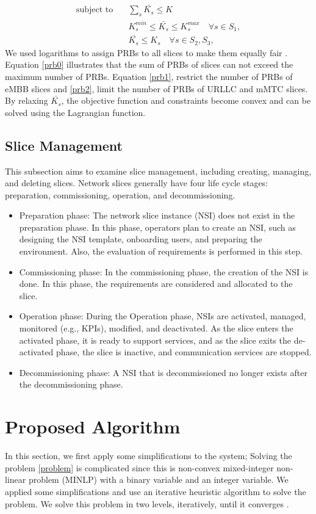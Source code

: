 \documentclass[lettersize,journal]{IEEEtran}
\begin{document}
{\begin{subequations}
\begin{alignat}{4}
\text{subject to} \quad  & \sum_s{\bar{K_s}} \leq K
 \label{prb0} \\
& K_s^{min} \leq \bar{K_s}  \leq K_s^{max}  \quad \forall s \in S_1,\label{prb1} \\
&  \bar{K_s} \leq K_s  \quad \forall s \in S_2, S_3,\label{prb2}
\end{alignat}
\label{constraints}
\end{subequations}
We used logarithms to assign PRBs to all slices to make them equally fair \cite{marabissi2019highly}.
Equation \eqref{prb0} illustrates that the sum of PRBs of slices can not exceed the maximum number of PRBs. 
Equation \eqref{prb1}, restrict the number of PRBs of eMBB slices and \eqref{prb2}, limit the number of PRBs of URLLC and mMTC slices. By relaxing $\bar{K_s}$, the objective function and constraints become convex and can be solved using the Lagrangian function.
}
\subsection{Slice Management}
\textcolor{RedViolet}{This subsection aims to examine slice management, including creating, managing, and deleting slices. Network slices generally have four life cycle stages: preparation, commissioning, operation, and decommissioning. 
\begin{itemize}
\item Preparation phase: The network slice instance (NSI) does not exist in the preparation phase. In this phase, operators plan to create an NSI, such as designing the NSI template, onboarding users, and preparing the environment. Also, the evaluation of requirements is performed in this step.
\item Commissioning phase: In the commissioning phase, the creation of the NSI is done. In this phase, the requirements are considered and allocated to the slice. 
\item Operation phase: During the Operation phase, NSIs are activated, managed, monitored (e.g., KPIs), modified, and deactivated. As the slice enters the activated phase, it is ready to support services, and as the slice exits the de-activated phase, the slice is inactive, and communication services are stopped.
\item Decommissioning phase: A NSI that is decommissioned no longer exists after the decommissioning phase.
\end{itemize}
}

\section{Proposed Algorithm}\label{proAlg}
In this section, we first apply some simplifications to the system; Solving the problem \eqref{problem} is complicated since this is non-convex mixed-integer non-linear problem (MINLP) with a binary variable and an integer variable. 
We applied some simplifications and use an iterative heuristic algorithm to solve the problem.
We solve this problem in two levels, iteratively, until it converges \cite{ali2018joint}.
\end{document}
